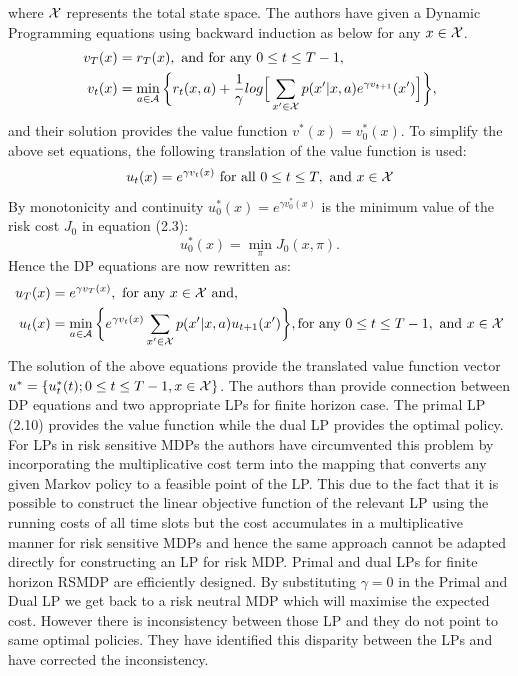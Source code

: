 \documentclass[11pt,a4paper,oneside]{report}
\begin{document}
where $\cal{X}$ represents the total state space. The authors have given a Dynamic Programming equations using backward induction as below for any $x\in \cal{X}$.
\begin{align}
\begin{split}
v_T(x) &= r_T(x), \text{   and for any  } 0\leq t\leq T-1, \\ 
v_t(x) &=\min_{a\in \cal{A}}\bigg \lbrace r_t(x,a) + \frac{1}{\gamma}log\Big[\sum_{x'\in \cal{X}} p(x'|x,a)e^{\gamma v_{t+1}}(x')\Big]\bigg\rbrace, 
\end{split}
\label{eqn:1}
\end{align}
and their solution provides the value function $v^*(x) = v_0^*(x)$. To simplify the above set equations, the following translation of the value function is used:
\begin{equation}
u_t(x) = e^{\gamma v_t(x)} \text{   for all } 0\leq t\leq T, \text{ and } x\in \cal{X}
\end{equation}
By monotonicity and continuity $u_0^*(x) = e^{\gamma v_0^*(x)}$ is the minimum value of the risk cost $J_0$ in equation (2.3):
\begin{equation}
u_0^*(x)=\min_\pi J_0(x,\pi).
\end{equation}
Hence the DP equations are now rewritten as:
\begin{align}
\begin{split}
u_T(x) &= e^{\gamma v_T(x)}, \text{ for any } x\in \cal{X} \text{ and},\\
u_t(x) &=\min_{a\in \cal{A}}\bigg \lbrace e^{\gamma v_t(x)}\sum_{x'\in \cal{X}} p(x'|x,a)u_{t+1}(x')\bigg\rbrace, 
\text{for any } 0\leq t \leq T-1, \text{ and } x\in \cal{X} 
\end{split}
\label{eqn:1}
\end{align}
The solution of the above equations provide the translated value function vector $u^* = \lbrace u_t^*(t); 0\leq t\leq T-1, x\in \cal{X}\rbrace$. The authors than provide connection between DP equations and two appropriate LPs for finite horizon case. The primal LP (2.10) provides the value function while the dual LP provides the optimal policy. For LPs in risk sensitive MDPs the authors have circumvented this problem by incorporating the multiplicative cost term into the mapping that converts any given Markov policy to a feasible point of the LP. This due to the fact that it is possible to construct the linear objective function of the relevant LP using the running costs of all time slots but the cost accumulates in a multiplicative manner for risk sensitive MDPs and hence the same approach cannot be adapted directly for constructing an LP for risk MDP. Primal and dual LPs for finite horizon RSMDP are efficiently designed.  By substituting $\gamma=0$ in the Primal and Dual LP we get back to a risk neutral MDP which will maximise the expected cost. However there is inconsistency between those LP and they do not point to same optimal policies. They have identified this disparity between the LPs and have corrected the inconsistency.
\end{document}
